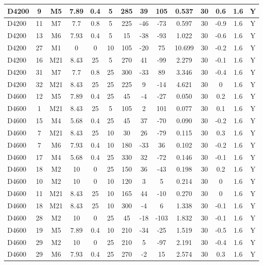 \documentclass{article}
\begin{document}
\begin{center}
\begin{longtable}{|l|c|c|c|c|c|c|c|c|c|c|c|c|c|}
D4200	&	9	&	M5	&	7.89	&	0.4	&	5	&	285	&	39	&	105	&	0.537	&	30	&	0.6	&	1.6	&	Y	\\\hline
D4200	&	11	&	M7	&	7.7	&	0.8	&	5	&	225	&	-46	&	-73	&	0.597	&	30	&	-0.9	&	1.6	&	Y	\\\hline
D4200	&	13	&	M6	&	7.93	&	0.4	&	5	&	15	&	-38	&	-93	&	1.022	&	30	&	-0.6	&	1.6	&	Y	\\\hline
D4200	&	27	&	M1	&	0	&	0	&	10	&	105	&	-20	&	75	&	10.699	&	30	&	-0.2	&	1.6	&	Y	\\\hline
D4200	&	16	&	M21	&	8.43	&	25	&	5	&	270	&	41	&	-99	&	2.279	&	30	&	-0.1	&	1.6	&	Y	\\\hline
D4200	&	31	&	M7	&	7.7	&	0.8	&	25	&	300	&	-33	&	89	&	3.346	&	30	&	-0.4	&	1.6	&	Y	\\\hline
D4200	&	32	&	M21	&	8.43	&	25	&	25	&	225	&	9	&	-14	&	4.621	&	30	&	0	&	1.6	&	Y	\\\hline
D4600	&	12	&	M5	&	7.89	&	0.4	&	25	&	45	&	-4	&	-27	&	0.050	&	30	&	0.2	&	1.6	&	Y	\\\hline
D4600	&	1	&	M21	&	8.43	&	25	&	5	&	105	&	2	&	101	&	0.077	&	30	&	0.1	&	1.6	&	Y	\\\hline
D4600	&	15	&	M4	&	5.68	&	0.4	&	25	&	45	&	37	&	-70	&	0.090	&	30	&	-0.2	&	1.6	&	Y	\\\hline
D4600	&	7	&	M21	&	8.43	&	25	&	10	&	30	&	26	&	-79	&	0.115	&	30	&	0.3	&	1.6	&	Y	\\\hline
D4600	&	7	&	M6	&	7.93	&	0.4	&	10	&	180	&	-33	&	36	&	0.102	&	30	&	-0.2	&	1.6	&	Y	\\\hline
D4600	&	17	&	M4	&	5.68	&	0.4	&	25	&	330	&	32	&	-72	&	0.146	&	30	&	-0.1	&	1.6	&	Y	\\\hline
D4600	&	18	&	M2	&	10	&	0	&	25	&	150	&	36	&	-43	&	0.198	&	30	&	0.2	&	1.6	&	Y	\\\hline
D4600	&	10	&	M2	&	10	&	0	&	10	&	120	&	3	&	5	&	0.214	&	30	&	0	&	1.6	&	Y	\\\hline
D4600	&	11	&	M21	&	8.43	&	25	&	10	&	165	&	44	&	-10	&	0.270	&	30	&	0	&	1.6	&	Y	\\\hline
D4600	&	18	&	M21	&	8.43	&	25	&	10	&	300	&	-4	&	6	&	1.338	&	30	&	-0.1	&	1.6	&	Y	\\\hline
D4600	&	28	&	M2	&	10	&	0	&	25	&	45	&	-18	&	-103	&	1.832	&	30	&	-0.1	&	1.6	&	Y	\\\hline
D4600	&	19	&	M5	&	7.89	&	0.4	&	10	&	210	&	-34	&	-25	&	1.519	&	30	&	-0.5	&	1.6	&	Y	\\\hline
D4600	&	29	&	M2	&	10	&	0	&	25	&	210	&	5	&	-97	&	2.191	&	30	&	-0.4	&	1.6	&	Y	\\\hline
D4600	&	29	&	M6	&	7.93	&	0.4	&	25	&	270	&	-2	&	15	&	2.574	&	30	&	0.3	&	1.6	&	Y	\\\hline

\end{longtable}
\end{center}
\end{document}
